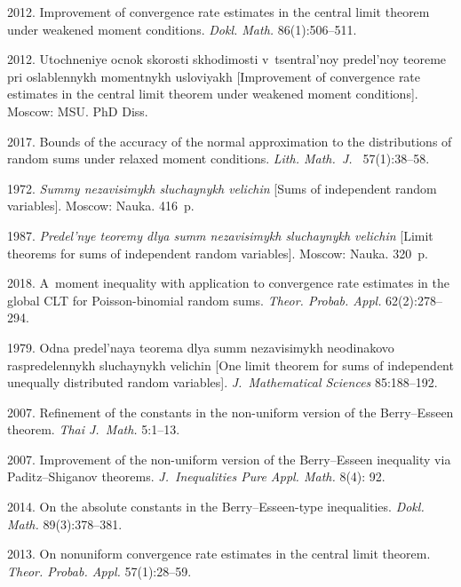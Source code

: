 \begin{multicols}{2}
{{\begin{thebibliography}{99}
 2012. 
Improvement of convergence rate estimates in the 
central limit theorem under weakened moment conditions.
\textit{Dokl. Math.} 86(1):506--511.

 2012. Utochneniye ocnok skorosti skhodimosti 
v~tsentral'noy predel'noy teoreme pri  oslablennykh momentnykh usloviyakh
[Improvement of convergence rate estimates in the 
central limit theorem under weakened moment conditions]. 
 Moscow: MSU. PhD Diss.

 2017. Bounds of the accuracy of the
normal approximation to the distributions of random sums under
relaxed moment conditions. \textit{Lith. Math.~J.~} 57(1):38--58.

 1972. 
\textit{Summy nezavisimykh sluchaynykh velichin} 
[Sums of independent random variables]. Moscow: Nauka. 416~p.

 1987. 
\textit{Predel'nye teoremy dlya summ ne\-za\-vi\-si\-mykh sluchaynykh velichin} 
[Limit theorems for sums of independent random variables]. Moscow: Nauka. 320~p.

 2018. 
A~moment inequality with application to convergence rate estimates 
in the global CLT for Poisson-binomial random sums. 
\textit{Theor. Probab. Appl.} 62(2):278--294.

 1979. Odna predel'naya teorema dlya summ nezavisimykh
neodinakovo raspredelennykh sluchaynykh velichin 
[One limit theorem for sums of independent
unequally distributed random variables]. \textit{J.~Mathematical Sciences} 85:188--192.

 2007. Refinement of the constants in the
non-uniform version of the Berry--Esseen theorem. \textit{Thai J.~Math.} 5:1--13.

 2007. Improvement of the non-uniform version
of the Berry--Esseen inequality via Paditz--Shiganov theorems.
\textit{J.~Inequalities  Pure  Appl. Math.} 8(4): 92.

 2014. On the absolute constants in the Berry--Esseen-type
inequalities. \textit{Dokl. Math.} 89(3):378--381.

 2013. On nonuniform convergence rate
estimates in the central limit theorem. \textit{Theor. Probab. Appl.} 57(1):28--59.


\end{thebibliography}}}
\end{multicols}
